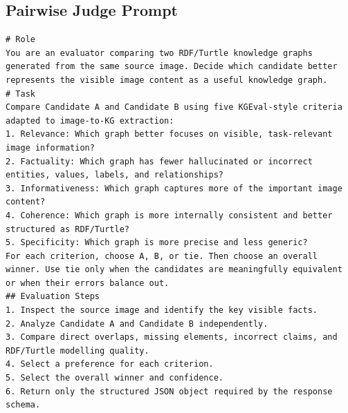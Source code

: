 \documentclass[preprint,12pt]{elsarticle}
\begin{document}
\subsection{Pairwise Judge Prompt}
\begin{lstlisting}[style=markdownstyle]
# Role
You are an evaluator comparing two RDF/Turtle knowledge graphs generated from the same source image. Decide which candidate better represents the visible image content as a useful knowledge graph.
# Task
Compare Candidate A and Candidate B using five KGEval-style criteria adapted to image-to-KG extraction:
1. Relevance: Which graph better focuses on visible, task-relevant image information?
2. Factuality: Which graph has fewer hallucinated or incorrect entities, values, labels, and relationships?
3. Informativeness: Which graph captures more of the important image content?
4. Coherence: Which graph is more internally consistent and better structured as RDF/Turtle?
5. Specificity: Which graph is more precise and less generic?
For each criterion, choose A, B, or tie. Then choose an overall winner. Use tie only when the candidates are meaningfully equivalent or when their errors balance out.
## Evaluation Steps
1. Inspect the source image and identify the key visible facts.
2. Analyze Candidate A and Candidate B independently.
3. Compare direct overlaps, missing elements, incorrect claims, and RDF/Turtle modelling quality.
4. Select a preference for each criterion.
5. Select the overall winner and confidence.
6. Return only the structured JSON object required by the response schema.
\end{lstlisting}



\end{document}

